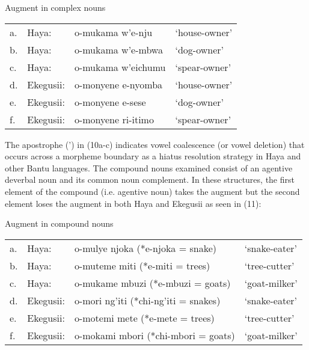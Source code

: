 \documentclass[output=paper]{langscibook}
\begin{document}
\begin{exe}
\ex Augment in complex nouns \\
\label{hayagusii10}
\begin{tabular}{llll}
     a. &	Haya: &		o-mukama w’e-nju &		‘house-owner’\\
b.&	Haya:	&	o-mukama w’e-mbwa	&	‘dog-owner’\\
c. &	Haya:	&	o-mukama w’eichumu &	‘spear-owner’\\
d. &	Ekegusii: &	o-monyene e-nyomba	 &	‘house-owner’\\
e. &	Ekegusii: &	o-monyene e-sese &		‘dog-owner’\\
f. &	Ekegusii: &	o-monyene ri-itimo	 &	‘spear-owner’\\

\end{tabular}
\end{exe}
The apostrophe (’) in (10a-c) indicates vowel coalescence (or vowel deletion) that occurs across a morpheme boundary as a hiatus resolution strategy in Haya and other Bantu languages. 
	The compound nouns examined consist of an agentive deverbal noun and its common noun complement. In these structures, the first element of the compound (i.e. agentive noun) takes the augment but the second element loses the augment in both Haya and Ekegusii as seen in (11): 

\begin{exe}
\ex Augment in compound nouns\\
\begin{tabular}{llll}
   a. &	Haya:	&	o-mulye njoka	(*e-njoka = snake)		& ‘snake-eater’ \\
b. &	Haya:	&	o-muteme miti	 (*e-miti = trees)		& ‘tree-cutter’ \\
c. &	Haya:	&	o-mukame mbuzi (*e-mbuzi = goats)		& ‘goat-milker’\\
d. &	Ekegusii: &	o-mori ng’iti (*chi-ng’iti = snakes)	& 	‘snake-eater’ \\
e. &	Ekegusii: &	o-motemi mete (*e-mete = trees)		& ‘tree-cutter’\\
f. &	Ekegusii: &	o-mokami mbori (*chi-mbori = goats)	&‘goat-milker’\\

\end{tabular}
\end{exe}
\end{document}
